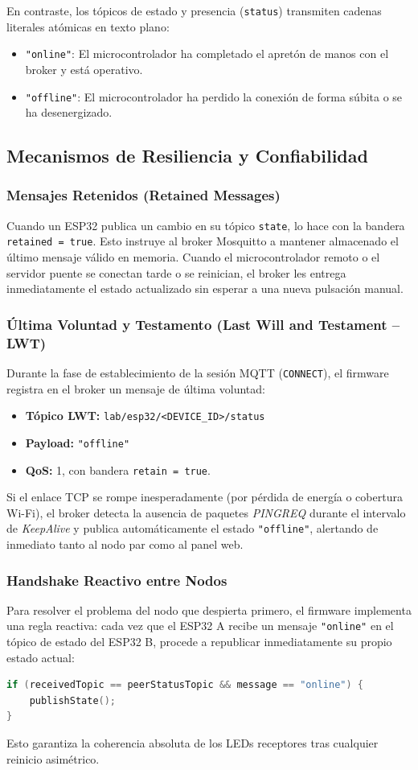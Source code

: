 \documentclass[11pt,a4paper]{article}
\begin{document}
En contraste, los tópicos de estado y presencia (\texttt{status}) transmiten cadenas literales atómicas en texto plano:
\begin{itemize}
    \item \texttt{"online"}: El microcontrolador ha completado el apretón de manos con el broker y está operativo.
    \item \texttt{"offline"}: El microcontrolador ha perdido la conexión de forma súbita o se ha desenergizado.
\end{itemize}

\subsection{Mecanismos de Resiliencia y Confiabilidad}
\subsubsection{Mensajes Retenidos (Retained Messages)}
Cuando un ESP32 publica un cambio en su tópico \texttt{state}, lo hace con la bandera \texttt{retained = true}. Esto instruye al broker Mosquitto a mantener almacenado el último mensaje válido en memoria. Cuando el microcontrolador remoto o el servidor puente se conectan tarde o se reinician, el broker les entrega inmediatamente el estado actualizado sin esperar a una nueva pulsación manual.

\subsubsection{Última Voluntad y Testamento (Last Will and Testament -- LWT)}
Durante la fase de establecimiento de la sesión MQTT (\texttt{CONNECT}), el firmware registra en el broker un mensaje de última voluntad:
\begin{itemize}
    \item \textbf{Tópico LWT:} \texttt{lab/esp32/<DEVICE\_ID>/status}
    \item \textbf{Payload:} \texttt{"offline"}
    \item \textbf{QoS:} 1, con bandera \texttt{retain = true}.
\end{itemize}
Si el enlace TCP se rompe inesperadamente (por pérdida de energía o cobertura Wi-Fi), el broker detecta la ausencia de paquetes \textit{PINGREQ} durante el intervalo de \textit{KeepAlive} y publica automáticamente el estado \texttt{"offline"}, alertando de inmediato tanto al nodo par como al panel web.

\subsubsection{Handshake Reactivo entre Nodos}
Para resolver el problema del nodo que despierta primero, el firmware implementa una regla reactiva: cada vez que el ESP32 A recibe un mensaje \texttt{"online"} en el tópico de estado del ESP32 B, procede a republicar inmediatamente su propio estado actual:
\begin{lstlisting}[language=C++]
if (receivedTopic == peerStatusTopic && message == "online") {
    publishState();
}
\end{lstlisting}
Esto garantiza la coherencia absoluta de los LEDs receptores tras cualquier reinicio asimétrico.
\end{document}
